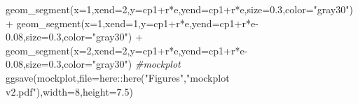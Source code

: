 \documentclass[
]{article}
\newenvironment{Shaded}{\begin{snugshade}}{\end{snugshade}}
\newcommand{\AttributeTok}[1]{\textcolor[rgb]{0.77,0.63,0.00}{#1}}
\newcommand{\CommentTok}[1]{\textcolor[rgb]{0.56,0.35,0.01}{\textit{#1}}}
\newcommand{\DecValTok}[1]{\textcolor[rgb]{0.00,0.00,0.81}{#1}}
\newcommand{\FloatTok}[1]{\textcolor[rgb]{0.00,0.00,0.81}{#1}}
\newcommand{\FunctionTok}[1]{\textcolor[rgb]{0.00,0.00,0.00}{#1}}
\newcommand{\NormalTok}[1]{#1}
\newcommand{\SpecialCharTok}[1]{\textcolor[rgb]{0.00,0.00,0.00}{#1}}
\newcommand{\StringTok}[1]{\textcolor[rgb]{0.31,0.60,0.02}{#1}}
\begin{document}
\begin{Shaded}
\begin{Highlighting}[]
  \FunctionTok{geom\_segment}\NormalTok{(}\AttributeTok{x=}\DecValTok{1}\NormalTok{,}\AttributeTok{xend=}\DecValTok{2}\NormalTok{,}\AttributeTok{y=}\NormalTok{cp1}\SpecialCharTok{+}\NormalTok{r}\SpecialCharTok{*}\NormalTok{e,}\AttributeTok{yend=}\NormalTok{cp1}\SpecialCharTok{+}\NormalTok{r}\SpecialCharTok{*}\NormalTok{e,}\AttributeTok{size=}\FloatTok{0.3}\NormalTok{,}\AttributeTok{color=}\StringTok{"gray30"}\NormalTok{) }\SpecialCharTok{+}
  \FunctionTok{geom\_segment}\NormalTok{(}\AttributeTok{x=}\DecValTok{1}\NormalTok{,}\AttributeTok{xend=}\DecValTok{1}\NormalTok{,}\AttributeTok{y=}\NormalTok{cp1}\SpecialCharTok{+}\NormalTok{r}\SpecialCharTok{*}\NormalTok{e,}\AttributeTok{yend=}\NormalTok{cp1}\SpecialCharTok{+}\NormalTok{r}\SpecialCharTok{*}\NormalTok{e}\FloatTok{{-}0.08}\NormalTok{,}\AttributeTok{size=}\FloatTok{0.3}\NormalTok{,}\AttributeTok{color=}\StringTok{"gray30"}\NormalTok{) }\SpecialCharTok{+}
  \FunctionTok{geom\_segment}\NormalTok{(}\AttributeTok{x=}\DecValTok{2}\NormalTok{,}\AttributeTok{xend=}\DecValTok{2}\NormalTok{,}\AttributeTok{y=}\NormalTok{cp1}\SpecialCharTok{+}\NormalTok{r}\SpecialCharTok{*}\NormalTok{e,}\AttributeTok{yend=}\NormalTok{cp1}\SpecialCharTok{+}\NormalTok{r}\SpecialCharTok{*}\NormalTok{e}\FloatTok{{-}0.08}\NormalTok{,}\AttributeTok{size=}\FloatTok{0.3}\NormalTok{,}\AttributeTok{color=}\StringTok{"gray30"}\NormalTok{) }
\CommentTok{\#mockplot}
\FunctionTok{ggsave}\NormalTok{(mockplot,}\AttributeTok{file=}\NormalTok{here}\SpecialCharTok{::}\FunctionTok{here}\NormalTok{(}\StringTok{"Figures"}\NormalTok{,}\StringTok{"mockplot v2.pdf"}\NormalTok{),}\AttributeTok{width=}\DecValTok{8}\NormalTok{,}\AttributeTok{height=}\FloatTok{7.5}\NormalTok{)}
\end{Highlighting}
\end{Shaded}
\end{document}
